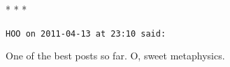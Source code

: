
\begin{center}* * *\end{center}

\begin{footnotesize}
\begin{sffamily}
\texttt{HOO on 2011-04-13 at 23:10 said:}

One of the best posts so far. O, sweet metaphysics.

\end{sffamily}
\end{footnotesize}

